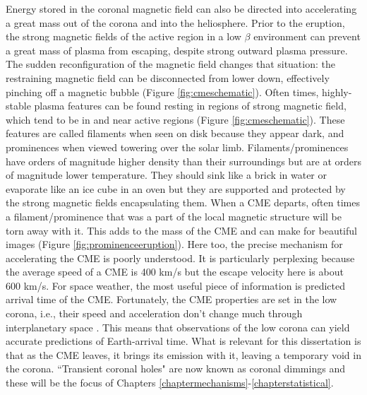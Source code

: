 Energy stored in the coronal magnetic field can also be directed into accelerating a great mass out of the corona and into the heliosphere. Prior to the eruption, the strong magnetic fields of the active region in a low $\beta$ environment can prevent a great mass of plasma from escaping, despite strong outward plasma pressure. The sudden reconfiguration of the magnetic field changes that situation: the restraining magnetic field can be disconnected from lower down, effectively pinching off a magnetic bubble (Figure \ref{fig:cmeschematic}). Often times, highly-stable plasma features can be found resting in regions of strong magnetic field, which tend to be in and near active regions (Figure \ref{fig:cmeschematic}). These features are called filaments when seen on disk because they appear dark, and prominences when viewed towering over the solar limb. Filaments/prominences have orders of magnitude higher density than their surroundings but are at orders of magnitude lower temperature. They should sink like a brick in water or evaporate like an ice cube in an oven but they are supported and protected by the strong magnetic fields encapsulating them. When a CME departs, often times a filament/prominence that was a part of the local magnetic structure will be torn away with it. This adds to the mass of the CME and can make for beautiful images (Figure \ref{fig:prominenceeruption}). Here too, the precise mechanism for accelerating the CME is poorly understood. It is particularly perplexing because the average speed of a CME is 400 km/s but the escape velocity here is about 600 km/s. For space weather, the most useful piece of information is predicted arrival time of the CME. Fortunately, the CME properties are set in the low corona, i.e., their speed and acceleration don't change much through interplanetary space \citep{Temmer2016}. This means that observations of the low corona can yield accurate predictions of Earth-arrival time. What is relevant for this dissertation is that as the CME leaves, it brings its emission with it, leaving a temporary void in the corona. ``Transient coronal holes" are now known as coronal dimmings and these will be the focus of Chapters \ref{chaptermechanisms}-\ref{chapterstatistical}. 

